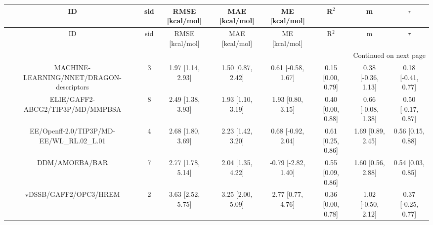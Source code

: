 \documentclass[8pt]{article}
\begin{document}
\begin{center}
\begin{footnotesize}
\begin{longtable}{|cccccccc|}
\toprule
                                       ID & sid &   RMSE [kcal/mol] &    MAE [kcal/mol] &       ME [kcal/mol] &             R$^2$ &                  m &             $\tau$ \\
\midrule
\endfirsthead

\toprule
                                       ID & sid &   RMSE [kcal/mol] &    MAE [kcal/mol] &       ME [kcal/mol] &             R$^2$ &                  m &             $\tau$ \\
\midrule
\endhead
\midrule
\multicolumn{8}{r}{{Continued on next page}} \\
\midrule
\endfoot

\bottomrule
\endlastfoot
 MACHINE-LEARNING/NNET/DRAGON-descriptors &   3 & 1.97 [1.14, 2.93] & 1.50 [0.87, 2.42] &  0.61 [-0.58, 1.67] & 0.15 [0.00, 0.79] & 0.38 [-0.36, 1.13] & 0.18 [-0.41, 0.77] \\
         ELIE/GAFF2-ABCG2/TIP3P/MD/MMPBSA &   8 & 2.49 [1.38, 3.93] & 1.93 [1.10, 3.19] &   1.93 [0.80, 3.15] & 0.40 [0.00, 0.88] & 0.66 [-0.08, 1.38] & 0.50 [-0.17, 0.87] \\
EE/Openff-2.0/TIP3P/MD-EE/WL\_RL.02\_L.01 &   4 & 2.68 [1.80, 3.69] & 2.23 [1.42, 3.20] &  0.68 [-0.92, 2.04] & 0.61 [0.25, 0.86] &  1.69 [0.89, 2.45] &  0.56 [0.15, 0.88] \\
                           DDM/AMOEBA/BAR &   7 & 2.77 [1.78, 5.14] & 2.04 [1.35, 4.22] & -0.79 [-2.82, 1.40] & 0.55 [0.09, 0.86] &  1.60 [0.56, 2.88] &  0.54 [0.03, 0.85] \\
                    vDSSB/GAFF2/OPC3/HREM &   2 & 3.63 [2.52, 5.75] & 3.25 [2.00, 5.09] &   2.77 [0.77, 4.76] & 0.36 [0.00, 0.78] & 1.02 [-0.50, 2.12] & 0.37 [-0.25, 0.77] \\
\end{longtable}
\end{footnotesize}
\end{center}
\end{document}
